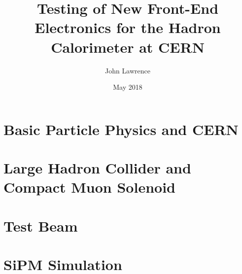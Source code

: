 \documentclass
[]
{thesis}
\title{Testing of New Front-End Electronics for the Hadron Calorimeter at CERN}
\author{John Lawrence}
\date{May 2018}
\begin{document}
	
\chapter{Basic Particle Physics and CERN}
\label{chap:intro}


\chapter{Large Hadron Collider and Compact Muon Solenoid}
\label{chap:LHC_CMS}


\chapter{Test Beam}
\label{chap:test}


\chapter{SiPM Simulation}
\label{chap:sim}


%

\begingroup
\raggedright
	
\endgroup
\end{document}

